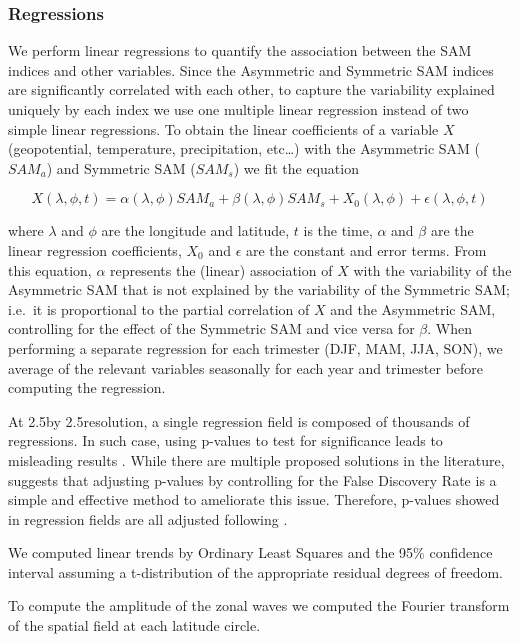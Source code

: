 \documentclass[]{ametsocV5}
\begin{document}
\subsubsection{Regressions}

We perform linear regressions to quantify the association between the
SAM indices and other variables. Since the Asymmetric and Symmetric SAM
indices are significantly correlated with each other, to capture the
variability explained uniquely by each index we use one multiple linear
regression instead of two simple linear regressions. To obtain the
linear coefficients of a variable \(X\) (geopotential, temperature,
precipitation, etc\ldots{}) with the Asymmetric SAM (\(SAM_a\)) and
Symmetric SAM (\(SAM_s\)) we fit the equation

\[
X(\lambda, \phi, t) = \alpha(\lambda, \phi) SAM_a + \beta(\lambda, \phi) SAM_s + X_0(\lambda, \phi) +  \epsilon(\lambda, \phi, t)
\]

where \(\lambda\) and \(\phi\) are the longitude and latitude, \(t\) is
the time, \(\alpha\) and \(\beta\) are the linear regression
coefficients, \(X_0\) and \(\epsilon\) are the constant and error terms.
From this equation, \(\alpha\) represents the (linear) association of
\(X\) with the variability of the Asymmetric SAM that is not explained
by the variability of the Symmetric SAM; i.e.~it is proportional to the
partial correlation of \(X\) and the Asymmetric SAM, controlling for the
effect of the Symmetric SAM and vice versa for \(\beta\). When
performing a separate regression for each trimester (DJF, MAM, JJA,
SON), we average of the relevant variables seasonally for each year and
trimester before computing the regression.

At 2.5\degree by 2.5\degree resolution, a single regression field is
composed of thousands of regressions. In such case, using p-values to
test for significance leads to misleading results
\citep{walker1914, katz1991}. While there are multiple proposed
solutions in the literature, \citet{wilks2016} suggests that adjusting
p-values by controlling for the False Discovery Rate
\citep{benjamini1995} is a simple and effective method to ameliorate
this issue. Therefore, p-values showed in regression fields are all
adjusted following \citet{benjamini1995}.

We computed linear trends by Ordinary Least Squares and the 95\%
confidence interval assuming a t-distribution of the appropriate
residual degrees of freedom.

To compute the amplitude of the zonal waves we computed the Fourier
transform of the spatial field at each latitude circle.
\end{document}
